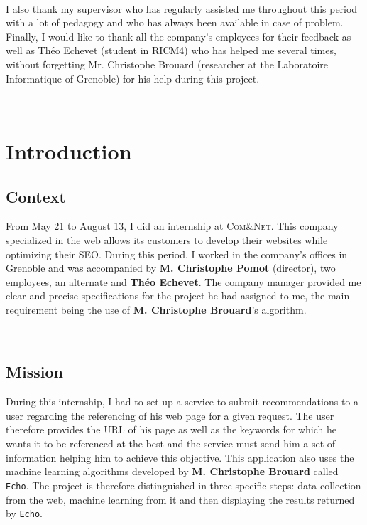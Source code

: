 \documentclass[12pt]{article}
\begin{document}
\

I also thank my supervisor who has regularly assisted me throughout this period with a lot of pedagogy and who has always been available in case of problem. Finally, I would like to thank all the company's employees for their feedback as well as Théo Echevet (student in RICM4) who has helped me several times, without forgetting Mr. Christophe Brouard (researcher at the Laboratoire Informatique of Grenoble) for his help during this project.
\

\


\newpage
\section{Introduction}

\subsection{Context}

From May 21 to August 13, I did an internship at \textsc{Com\&Net}. This company specialized in the web allows its customers to develop their websites while optimizing their SEO. During this period, I worked in the company's offices in Grenoble and was accompanied by \textbf{M. Christophe Pomot} (director), two employees, an alternate and \textbf{Théo Echevet}. The company manager provided me clear and precise specifications for the project he had assigned to me, the main requirement being the use of \textbf{M. Christophe Brouard}'s algorithm.

\

\subsection{Mission}

During this internship, I had to set up a service to submit recommendations to a user regarding the referencing of his web page for a given request. The user therefore provides the URL of his page as well as the keywords for which he wants it to be referenced at the best and the service must send him a set of information helping him to achieve this objective. This application also uses the machine learning algorithms developed by \textbf{M. Christophe Brouard} called \texttt{Echo}. The project is therefore distinguished in three specific steps: data collection from the web, machine learning from it and then displaying the results returned by \texttt{Echo}. 
\end{document}
